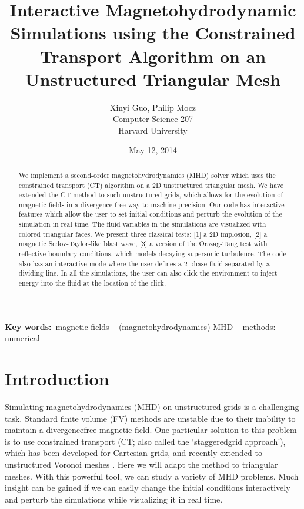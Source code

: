 \documentclass[12pt]{article}
\title{Interactive Magnetohydrodynamic Simulations using the Constrained Transport Algorithm on an Unstructured Triangular Mesh }
\author{Xinyi Guo, Philip Mocz \\ Computer Science 207 \\ Harvard University}
\date{May 12, 2014}
\begin{document}

\maketitle

\begin{abstract}
We implement a second-order magnetohydrodynamics (MHD) solver which uses the constrained transport (CT) algorithm on a 2D unstructured triangular mesh. We have extended the CT method to such unstructured grids, which allows for the evolution of magnetic fields in a divergence-free way to machine precision. Our code has interactive features which allow the user to set initial conditions and perturb the evolution of the simulation in real time. The fluid variables in the simulations are visualized with colored triangular faces. We present three classical tests: [1] a 2D implosion, [2] a magnetic Sedov-Taylor-like blast wave, [3] a version of the Orszag-Tang test with reflective boundary conditions, which models decaying supersonic turbulence. The code also has an interactive mode where the user defines a 2-phase fluid separated by a dividing line. In all the simulations, the user can also click the environment to inject energy into the fluid at the location of the click.
\end{abstract}

\begin{center}
{\bf Key words:}\, magnetic fields -- (magnetohydrodynamics) MHD -- methods: numerical
\end{center}

\section{Introduction}\label{sec:intro}

Simulating magnetohydrodynamics (MHD) on unstructured grids is a challenging task. Standard finite volume (FV) methods are unstable due to their inability to maintain a divergence­free magnetic field. One particular solution to this problem is to use constrained transport (CT; also called the ‘staggered­grid approach’), which has been developed for Cartesian grids, and recently extended to unstructured Voronoi meshes \citep{2014arXiv1402.5963M}. Here we will adapt the method to triangular meshes. With this powerful tool, we can study a variety of MHD problems. Much insight can be gained if we can easily change the initial conditions interactively and perturb the simulations while visualizing it in real time.
\end{document}
